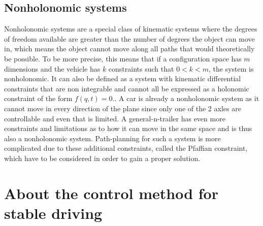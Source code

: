 
\subsection{Nonholonomic systems}
\label{sec:nonholonomic_systems}

Nonholonomic systems are a special class of kinematic systems where the degrees of freedom available are greater than the number of degrees the object can move in, which means the object cannot move along all paths that would theoretically be possible. To be more precise, this means that if a configuration space has $m$ dimensions and the vehicle has $k$ constraints such that $0<k<m$, the system is nonholonomic. It can also be defined as a system with kinematic differential constraints that are non integrable and cannot all be expressed as a holonomic constraint of the form $f(q,t)=0$.\cite{29,30}. A car is already a nonholonomic system as it cannot move in every direction of the plane since only one of the 2 axles are controllable and even that is limited. A general-n-trailer has even more constraints and limitations as to how it can move in the same space and is thus also a nonholonomic system. Path-planning for such a system is more complicated due to these additional constraints, called the Pfaffian constraint, which have to be considered in order to gain a proper solution. 

\section{About the control method for stable driving}
\label{sec:about_control_method}

